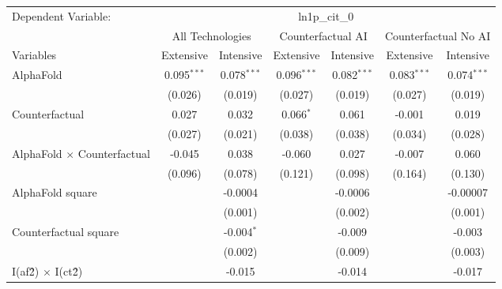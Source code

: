 \begingroup
\centering
\begin{tabular}{lcccccc}
   \tabularnewline \midrule \midrule
   Dependent Variable: & \multicolumn{6}{c}{ln1p\_cit\_0}\\
 & \multicolumn{2}{c}{All Technologies} & \multicolumn{2}{c}{Counterfactual AI} & \multicolumn{2}{c}{Counterfactual No AI} \\
\cmidrule(lr){1-1}\cmidrule(lr){2-3} \cmidrule(lr){4-5} \cmidrule(lr){6-7}
Variables & \multicolumn{1}{c}{Extensive} & \multicolumn{1}{c}{Intensive} & \multicolumn{1}{c}{Extensive} & \multicolumn{1}{c}{Intensive} & \multicolumn{1}{c}{Extensive} & \multicolumn{1}{c}{Intensive} \\
\cmidrule(lr){1-1}\cmidrule(lr){2-2} \cmidrule(lr){3-3} \cmidrule(lr){4-4} \cmidrule(lr){5-5} \cmidrule(lr){6-6} \cmidrule(lr){7-7}
   AlphaFold                          & 0.095$^{***}$ & 0.078$^{***}$ & 0.096$^{***}$ & 0.082$^{***}$ & 0.083$^{***}$ & 0.074$^{***}$\\   
                                      & (0.026)       & (0.019)       & (0.027)       & (0.019)       & (0.027)       & (0.019)\\   
   Counterfactual                     & 0.027         & 0.032         & 0.066$^{*}$   & 0.061         & -0.001        & 0.019\\   
                                      & (0.027)       & (0.021)       & (0.038)       & (0.038)       & (0.034)       & (0.028)\\   
   AlphaFold $\times$ Counterfactual  & -0.045        & 0.038         & -0.060        & 0.027         & -0.007        & 0.060\\   
                                      & (0.096)       & (0.078)       & (0.121)       & (0.098)       & (0.164)       & (0.130)\\   
   AlphaFold square                   &               & -0.0004       &               & -0.0006       &               & -0.00007\\   
                                      &               & (0.001)       &               & (0.002)       &               & (0.001)\\   
   Counterfactual square              &               & -0.004$^{*}$  &               & -0.009        &               & -0.003\\   
                                      &               & (0.002)       &               & (0.009)       &               & (0.003)\\   
   I(af\^2) $\times$ I(ct\^2)         &               & -0.015        &               & -0.014        &               & -0.017\\   

\end{tabular}
